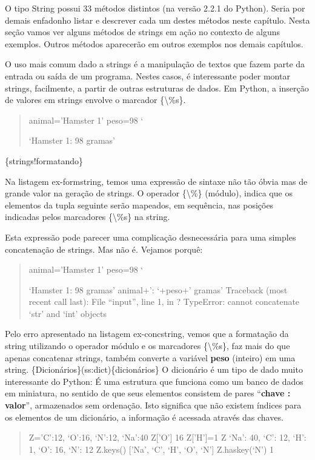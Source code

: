 \documentclass[a4paper,10pt,portuguese]{sphinxmanual}
\begin{document}
O tipo String possui 33 métodos distintos (na versão 2.2.1 do
Python). Seria por demais enfadonho listar e descrever cada um
destes métodos neste capítulo. Nesta seção vamos ver alguns métodos
de strings em ação no contexto de alguns exemplos. Outros métodos
aparecerão em outros exemplos nos demais capítulos.

O uso mais comum dado a strings é a manipulação de textos que fazem
parte da entrada ou saída de um programa. Nestes casos, é
interessante poder montar strings, facilmente, a partir de outras
estruturas de dados. Em Python, a inserção de valores em strings
envolve o marcador \{\textbackslash{}\%s\}.
\begin{quote}

animal='Hamster 1' peso=98 `

`Hamster 1: 98 gramas'
\end{quote}

\{strings!formatando\}

Na listagem ex-formstring, temos uma expressão de sintaxe não tão
óbvia mas de grande valor na geração de strings. O operador \{\textbackslash{}\%\}
(módulo), indica que os elementos da tupla seguinte serão mapeados,
em sequência, nas posições indicadas pelos marcadores \{\textbackslash{}\%s\} na
string.

Esta expressão pode parecer uma complicação desnecessária para uma
simples concatenação de strings. Mas não é. Vejamos porquê:
\begin{quote}

animal='Hamster 1' peso=98 `

`Hamster 1: 98 gramas' animal+': `+peso+' gramas' Traceback (most
recent call last): File ``input'', line 1, in ? TypeError: cannot
concatenate `str' and `int' objects
\end{quote}

Pelo erro apresentado na listagem ex-concstring, vemos que a
formatação da string utilizando o operador módulo e os marcadores
\{\textbackslash{}\%s\}, faz mais do que apenas concatenar strings, também converte
a variável \textbf{peso} (inteiro) em uma string.
\{Dicionários\}(ss:dict)\{dicionários\} O dicionário é um tipo de dado
muito interessante do Python: É uma estrutura que funciona como um
banco de dados em miniatura, no sentido de que seus elementos
consistem de pares ``\textbf{chave : valor}'', armazenados sem ordenação.
Isto significa que não existem índices para os elementos de um
dicionário, a informação é acessada através das chaves.
\begin{quote}

Z='C':12, `O':16, `N':12, `Na':40 Z{[}'O'{]} 16 Z{[}'H'{]}=1 Z `Na': 40,
`C': 12, `H': 1, `O': 16, `N': 12 Z.keys() {[}'Na', `C', `H', `O',
`N'{]} Z.haskey(`N') 1
\end{quote}
\end{document}
